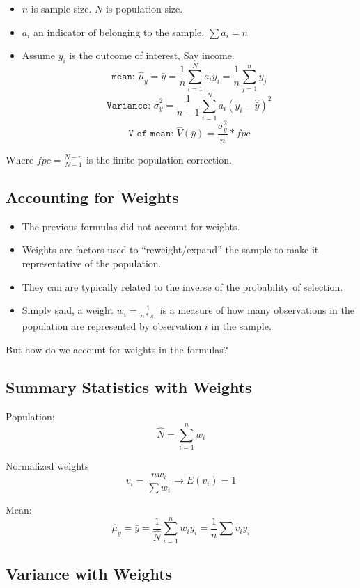 \documentclass[
  letterpaper,
  DIV=11,
  numbers=noendperiod]{scrartcl}
\providecommand{\tightlist}{%
  \setlength{\itemsep}{0pt}\setlength{\parskip}{0pt}}\usepackage{longtable,booktabs,array}
\begin{document}
\begin{itemize}
\tightlist
\item
  \(n\) is sample size. \(N\) is population size.
\item
  \(a_i\) an indicator of belonging to the sample. \(\sum a_i=n\)
\item
  Assume \(y_i\) is the outcome of interest, Say income.
  \[\texttt{mean: }\hat{\mu}_y=\bar{y} = \frac{1}{n}\sum_{i=1}^N a_i y_i = \frac{1}{n}\sum_{j=1}^n y_j\]
  \[\texttt{Variance: }\hat \sigma^2_y = \frac{1}{n-1} \sum_{i=1}^N a_i (y_i - \hat{\bar{y}} )^2\]
  \[\texttt{V of mean: }\widehat{V}(\bar{y}) = \frac{\sigma^2_y }{n} * fpc\]
\end{itemize}

Where \(fpc = \frac{N-n}{N-1}\) is the finite population correction.

\subsection{Accounting for Weights}\label{accounting-for-weights}

\begin{itemize}
\item
  The previous formulas did not account for weights.
\item
  Weights are factors used to ``reweight/expand'' the sample to make it
  representative of the population.
\item
  They can are typically related to the inverse of the probability of
  selection.
\item
  Simply said, a weight \(w_i=\frac{1}{n*\pi_i}\) is a measure of how
  many observations in the population are represented by observation
  \(i\) in the sample.
\end{itemize}

But how do we account for weights in the formulas?

\subsection{Summary Statistics with
Weights}\label{summary-statistics-with-weights}

Population: \[\hat N = \sum_{i=1}^n w_i\]

Normalized weights
\[v_i = \frac{n w_i}{ \sum w_i} \rightarrow E(v_i) = 1\]

Mean:
\[\hat{\mu}_y=\bar{y} = \frac{1}{\hat N}\sum_{i=1}^n w_i y_i = \frac{1}{n}\sum v_i y_i\]

\subsection{Variance with Weights}\label{variance-with-weights}
\end{document}

